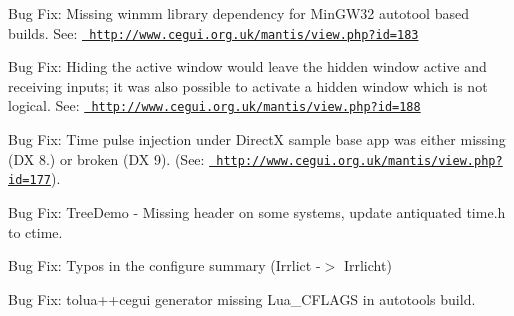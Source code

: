 \begin{DoxyItemize}
\item Bug Fix\+: Missing winmm library dependency for Min\+G\+W32 autotool based builds. See\+: \href{http://www.cegui.org.uk/mantis/view.php?id=183}{\texttt{ http\+://www.\+cegui.\+org.\+uk/mantis/view.\+php?id=183}}
\item Bug Fix\+: Hiding the active window would leave the hidden window active and receiving inputs; it was also possible to activate a hidden window which is not logical. See\+: \href{http://www.cegui.org.uk/mantis/view.php?id=188}{\texttt{ http\+://www.\+cegui.\+org.\+uk/mantis/view.\+php?id=188}}
\item Bug Fix\+: Time pulse injection under DirectX sample base app was either missing (DX 8.) or broken (DX 9). (See\+: \href{http://www.cegui.org.uk/mantis/view.php?id=177}{\texttt{ http\+://www.\+cegui.\+org.\+uk/mantis/view.\+php?id=177}}).
\item Bug Fix\+: Tree\+Demo -\/ Missing header on some systems, update antiquated time.\+h to ctime.
\item Bug Fix\+: Typos in the configure summary (Irrlict -\/$>$ Irrlicht)
\item Bug Fix\+: tolua++cegui generator missing Lua\+\_\+\+C\+F\+L\+A\+GS in autotools build.
\end{DoxyItemize}

